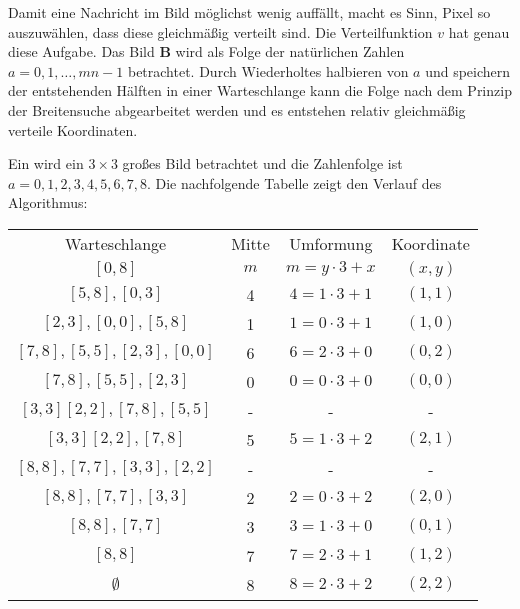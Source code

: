\noindent
Damit eine Nachricht im Bild möglichst wenig auffällt, macht es Sinn, Pixel
so auszuwählen, dass diese gleichmäßig verteilt sind. Die Verteilfunktion $v$ hat genau diese
Aufgabe. Das Bild $\mathbf{B}$ wird als Folge der natürlichen Zahlen
$a = 0,1,\ldots,mn - 1$ betrachtet. Durch Wiederholtes halbieren von $a$ und
speichern der entstehenden Hälften in einer Warteschlange kann die Folge nach
dem Prinzip der Breitensuche abgearbeitet werden und es entstehen relativ gleichmäßig
verteile Koordinaten.
\begin{example}
  Ein wird ein $3 \times 3$ großes Bild betrachtet und die Zahlenfolge ist
  $a = 0,1,2,3,4,5,6,7,8$. Die nachfolgende Tabelle zeigt den Verlauf des Algorithmus:
  \begin{center}
    \begin{tabular}{cccc}
      \multicolumn{1}{c}{Warteschlange} & Mitte & Umformung           & Koordinate \\
      $[0,8]$                           & $m$   & $m = y \cdot 3 + x$ & $(x,y)$    \\
      $[5,8],[0,3]$                     & 4     & $4 = 1 \cdot 3 + 1$ & $(1,1)$    \\
      $[2,3],[0,0],[5,8]$               & 1     & $1 = 0 \cdot 3 + 1$ & $(1,0)$    \\
      $[7,8],[5,5],[2,3],[0,0]$         & 6     & $6 = 2 \cdot 3 + 0$ & $(0,2)$    \\
      $[7,8],[5,5],[2,3]$               & 0     & $0 = 0 \cdot 3 + 0$ & $(0,0)$    \\
      $[3,3][2,2],[7,8],[5,5]$          & -     & -                   & -          \\
      $[3,3][2,2],[7,8]$                & 5     & $5 = 1 \cdot 3 + 2$ & $(2,1)$    \\
      $[8,8],[7,7],[3,3],[2,2]$         & -     & -                   & -          \\
      $[8,8],[7,7],[3,3]$               & 2     & $2 = 0 \cdot 3 + 2$ & $(2,0)$    \\
      $[8,8],[7,7]$                     & 3     & $3 = 1 \cdot 3 + 0$ & $(0,1)$    \\
      $[8,8]$                           & 7     & $7 = 2 \cdot 3 + 1$ & $(1,2)$    \\
      $\emptyset$                       & 8     & $8 = 2 \cdot 3 + 2$ & $(2,2)$
    \end{tabular}
  \end{center}
\end{example}

